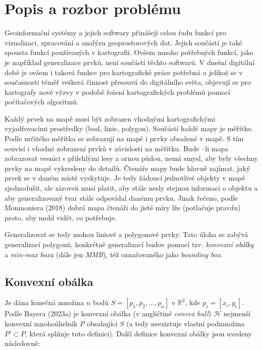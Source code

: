 \chapter*{Popis a rozbor problému}

\par Geoinformační systémy a jejich softwary přinášejí celou řadu funkcí pro vizualizaci, zpracování a analýzu geoprostorových dat. Jejich součástí je také spousta funkcí používaných v kartografii. Ovšem mnoho potřebných funkcí, jako je například generalizace prvků, není součástí těchto softwarů. V dnešní digitální době je ovšem i taková funkce pro kartografické práce potřebná a jelikož se v současnosti téměř veškerá činnost přesouvá do digitálního světa, objevují se pro kartografy nové výzvy v podobě řešení kartografických problémů pomocí počítačových algoritmů.

\par Každý prvek na mapě musí být zobrazen vhodnými kartografickými vyjadřovacími prostředky (bod, linie, polygon). Součástí každé mapy je měřítko. Podle určitého měřítka se zobrazují na mapě i prvky obsažené v mapě. S tím souvisí i vhodné zobrazení prvků v závislosti na měřítku. Bude –li mapa zobrazovat vesnici s přilehlými lesy a ornou půdou, nemá smysl, aby byly všechny prvky na mapě vykresleny do detailů. Čtenáře mapy bude hlavně zajímat, jaký prvek se v daném místě vyskytuje. Je tedy žádoucí jednotlivé objekty v mapě zjednodušit, ale zároveň musí platit, aby stále nesly stejnou informaci o objektu a aby generalizovaný tvar stále odpovídal danému prvku. Jinak řečeno, podle Monmoniera (2018) dobrá mapa čtenáři do jisté míry lže (potlačuje pravdu) proto, aby mohl vidět, co potřebuje.

\par Generalizovat se tedy mohou liniové a polygonové prvky. Tato úloha se zabývá generalizací polygonů, konkrétně generalizací budov pomocí tzv. \emph{konvexní obálky} a \emph{min-max boxu} (dále jen \emph{MMB}), též označovaného jako \emph{bounding box}.
\bigbreak

\section*{Konvexní obálka}

\par Je dána konečná množina $n$ bodů $S = [p_1, p_2, ..., p_n]$ v $\mathbb{R}^2$, kde $p_i = [x_i, y_i]$. Podle Bayera (2023a) je konvexní obálka (v angličtině \emph{convex hull}) $\mathcal{H}$ nejmenší konvexní mnohoúhelník $P$ obsahující $S$ (a tedy neexistuje vlastní podmnožina $P' \subset P$, která splňuje tuto definici). Další definice konvexní obálky jsou uvedeny následovně:

